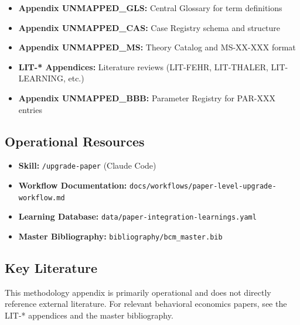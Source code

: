 \begin{itemize}
    \item \textbf{Appendix UNMAPPED_GLS:} Central Glossary for term definitions
    \item \textbf{Appendix UNMAPPED_CAS:} Case Registry schema and structure
    \item \textbf{Appendix UNMAPPED_MS:} Theory Catalog and MS-XX-XXX format
    \item \textbf{LIT-* Appendices:} Literature reviews (LIT-FEHR, LIT-THALER, LIT-LEARNING, etc.)
    \item \textbf{Appendix UNMAPPED_BBB:} Parameter Registry for PAR-XXX entries
\end{itemize}

\subsection{Operational Resources}

\begin{itemize}
    \item \textbf{Skill:} \texttt{/upgrade-paper} (Claude Code)
    \item \textbf{Workflow Documentation:} \texttt{docs/workflows/paper-level-upgrade-workflow.md}
    \item \textbf{Learning Database:} \texttt{data/paper-integration-learnings.yaml}
    \item \textbf{Master Bibliography:} \texttt{bibliography/bcm\_master.bib}
\end{itemize}

\subsection{Key Literature}

This methodology appendix is primarily operational and does not directly reference
external literature. For relevant behavioral economics papers, see the LIT-* appendices
and the master bibliography.

\nocite{bcm_master}

